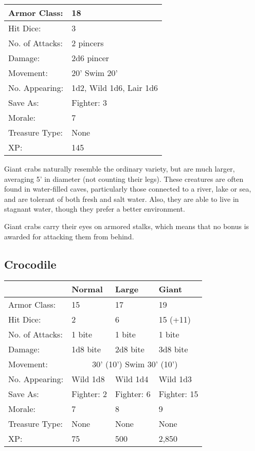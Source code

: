 \documentclass[a4paper,twoside,openany,10pt]{book}
\begin{document}
\begin{multicols}{2}
\begin{tabularx}{0.48\textwidth}{@{}lX@{}}
Armor Class: & 18 \\\hline
Hit Dice: & 3 \\\hline
No. of Attacks: & 2 pincers \\\hline
Damage: & 2d6 pincer \\\hline
Movement: & 20' Swim 20' \\\hline
No. Appearing: & 1d2, Wild 1d6, Lair 1d6 \\\hline
Save As: & Fighter: 3 \\\hline
Morale: & 7 \\\hline
Treasure Type: & None \\\hline
XP: & 145 \\\hline
\end{tabularx}\medskip

Giant crabs naturally resemble the ordinary variety, but are much larger, averaging 5' in diameter (not counting their legs). These creatures are often found in water-filled caves, particularly those connected to a river, lake or sea, and are tolerant of both fresh and salt water. Also, they are able to live in stagnant water, though they prefer a better environment.

Giant crabs carry their eyes on armored stalks, which means that no bonus is awarded for attacking them from behind.

\subsection*{Crocodile}\label{crocodile}

\begin{tabularx}{0.48\textwidth}{lXXX}
& Normal & Large & Giant \\\hline
Armor Class: & 15 & 17 & 19 \\\hline
Hit Dice: & 2 & 6 & 15 (+11) \\\hline
No. of Attacks: & 1 bite & 1 bite & 1 bite \\\hline
Damage: & 1d8 bite & 2d8 bite & 3d8 bite \\\hline
Movement: & \multicolumn{3}{c}{30' (10') Swim 30' (10')} \\\hline
No. Appearing: & Wild 1d8 & Wild 1d4 & Wild 1d3 \\\hline
Save As: & Fighter: 2 & Fighter: 6 & Fighter: 15 \\\hline
Morale: & 7 & 8 & 9 \\\hline
Treasure Type: & None & None & None \\\hline
XP: & 75 & 500 & 2,850 \\\hline
\end{tabularx}\medskip


\end{multicols}
\end{document}
